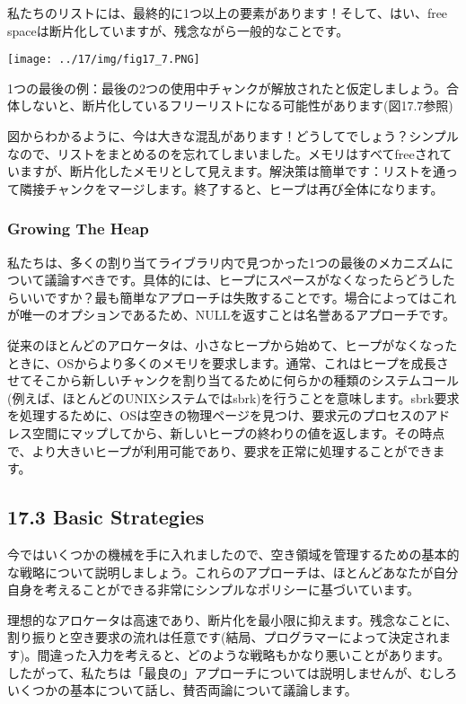 私たちのリストには、最終的に1つ以上の要素があります！そして、はい、free
spaceは断片化していますが、残念ながら一般的なことです。

\texttt{[image: ../17/img/fig17\_7.PNG]}

1つの最後の例：最後の2つの使用中チャンクが解放されたと仮定しましょう。合体しないと、断片化しているフリーリストになる可能性があります(図17.7参照)

図からわかるように、今は大きな混乱があります！どうしてでしょう？シンプルなので、リストをまとめるのを忘れてしまいました。メモリはすべてfreeされていますが、断片化したメモリとして見えます。解決策は簡単です：リストを通って隣接チャンクをマージします。終了すると、ヒープは再び全体になります。

\hypertarget{growing-the-heap}{%
\subsubsection*{Growing The Heap}\label{growing-the-heap}}

私たちは、多くの割り当てライブラリ内で見つかった1つの最後のメカニズムについて議論すべきです。具体的には、ヒープにスペースがなくなったらどうしたらいいですか？最も簡単なアプローチは失敗することです。場合によってはこれが唯一のオプションであるため、NULLを返すことは名誉あるアプローチです。

従来のほとんどのアロケータは、小さなヒープから始めて、ヒープがなくなったときに、OSからより多くのメモリを要求します。通常、これはヒープを成長させてそこから新しいチャンクを割り当てるために何らかの種類のシステムコール(例えば、ほとんどのUNIXシステムではsbrk)を行うことを意味します。sbrk要求を処理するために、OSは空きの物理ページを見つけ、要求元のプロセスのアドレス空間にマップしてから、新しいヒープの終わりの値を返します。その時点で、より大きいヒープが利用可能であり、要求を正常に処理することができます。

\hypertarget{basic-strategies}{%
\subsection*{17.3 Basic Strategies}\label{basic-strategies}}

今ではいくつかの機械を手に入れましたので、空き領域を管理するための基本的な戦略について説明しましょう。これらのアプローチは、ほとんどあなたが自分自身を考えることができる非常にシンプルなポリシーに基づいています。

理想的なアロケータは高速であり、断片化を最小限に抑えます。残念なことに、割り振りと空き要求の流れは任意です(結局、プログラマーによって決定されます)。間違った入力を考えると、どのような戦略もかなり悪いことがあります。したがって、私たちは「最良の」アプローチについては説明しませんが、むしろいくつかの基本について話し、賛否両論について議論します。

